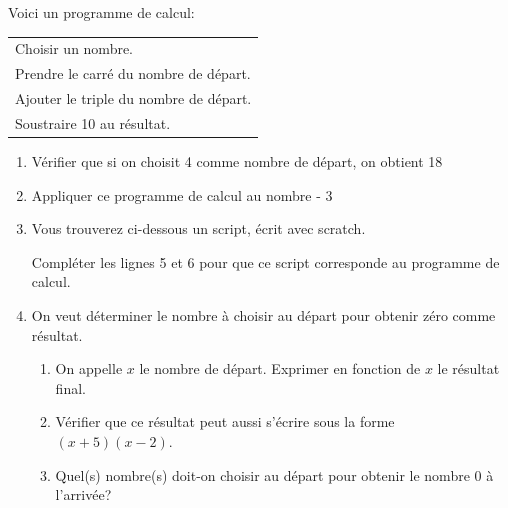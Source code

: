 
\medskip

\parbox{0.45\linewidth}{Voici un programme de calcul:}
\hfill
\parbox{0.45\linewidth}{\begin{tabular}{|l|}\hline
Choisir un nombre.\\
Prendre le carré du nombre de départ.\\
Ajouter le triple du nombre de départ.\\
Soustraire 10 au résultat.\\ \hline
\end{tabular}}

\medskip

\begin{enumerate}
\item Vérifier que si on choisit 4 comme nombre de départ, on obtient 18 
\item Appliquer ce programme de calcul au nombre - 3
\item Vous trouverez ci-dessous un script, écrit avec scratch.


\begin{scratch}
\end{scratch}

\medskip

Compléter les lignes 5 et 6 pour que ce script corresponde au programme de calcul.

\item On veut déterminer le nombre à choisir au départ pour obtenir zéro comme résultat. 
	\begin{enumerate}
		\item On appelle $x$ le nombre de départ. Exprimer en fonction de $x$ le résultat final.
		\item Vérifier que ce résultat peut aussi s'écrire sous la forme $(x + 5)(x - 2)$.
		\item Quel(s) nombre(s) doit-on choisir au départ pour obtenir le nombre $0$ à l'arrivée?
	\end{enumerate}
\end{enumerate}

\bigskip

